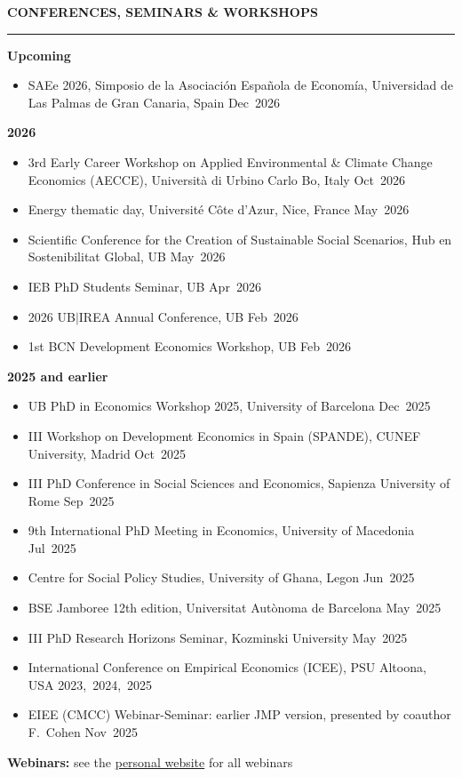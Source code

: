 \documentclass{resume} %
\def\sectionskip{\vspace{4pt}}
\def\sectionlineskip{\smallskip}
\renewenvironment{rSection}[1]{%
  \sectionskip
  \MakeUppercase{{\bf #1}}%
  \sectionlineskip
  \hrule
  \begin{list}{}{\setlength{\leftmargin}{0em}\setlength{\topsep}{5pt}\setlength{\itemsep}{0pt}\setlength{\parsep}{0pt}}%
  \item[]
}{%
  \end{list}
}
\newcommand{\when}[1]{\hfill\mbox{#1}}
\begin{document}
\begin{rSection}{Conferences, Seminars \& Workshops}
\textbf{Upcoming}
\begin{itemize}
\item SAEe 2026, Simposio de la Asociación Española de Economía, Universidad de Las Palmas de Gran Canaria, Spain \when{Dec 2026}
\end{itemize}

\textbf{2026}
\begin{itemize}
\item 3rd Early Career Workshop on Applied Environmental \& Climate Change Economics (AECCE), Università di Urbino Carlo Bo, Italy \when{Oct 2026}
\item Energy thematic day, Université Côte d'Azur, Nice, France \when{May 2026}
\item Scientific Conference for the Creation of Sustainable Social Scenarios, Hub en Sostenibilitat Global, UB \when{May 2026}
\item IEB PhD Students Seminar, UB \when{Apr 2026}
\item 2026 UB$|$IREA Annual Conference, UB \when{Feb 2026}
\item 1st BCN Development Economics Workshop, UB \when{Feb 2026}
\end{itemize}

\textbf{2025 and earlier}
\begin{itemize}
\item UB PhD in Economics Workshop 2025, University of Barcelona \when{Dec 2025}
\item III Workshop on Development Economics in Spain (SPANDE), CUNEF University, Madrid \when{Oct 2025}
\item III PhD Conference in Social Sciences and Economics, Sapienza University of Rome \when{Sep 2025}
\item 9th International PhD Meeting in Economics, University of Macedonia \when{Jul 2025}
\item Centre for Social Policy Studies, University of Ghana, Legon \when{Jun 2025}
\item BSE Jamboree 12th edition, Universitat Autònoma de Barcelona \when{May 2025}
\item III PhD Research Horizons Seminar, Kozminski University \when{May 2025}
\item International Conference on Empirical Economics (ICEE), PSU Altoona, USA \when{2023, 2024, 2025}
\item EIEE (CMCC) Webinar-Seminar: earlier JMP version, presented by coauthor F.~Cohen \when{Nov 2025}
\end{itemize}

\textbf{Webinars:} see the \href{https://ntsifulenoch.github.io/conferences/}{personal website} for all webinars
\end{rSection}
\end{document}
